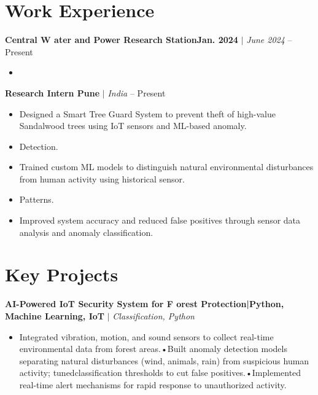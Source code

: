 \documentclass[10pt,letterpaper]{article}
\begin{document}
\section{Work Experience}

\noindent \textbf{Central W ater and Power Research StationJan. 2024} $|$ \textit{June 2024} \hfill  -- Present \\

\begin{itemize}
    
    \item 
    
\end{itemize}
\vspace{4pt}

\noindent \textbf{Research Intern Pune} $|$ \textit{India} \hfill  -- Present \\

\begin{itemize}
    
    \item Designed a Smart Tree Guard System to prevent theft of high-value Sandalwood trees using IoT sensors and ML-based anomaly.
    
    \item Detection.
    
    \item Trained custom ML models to distinguish natural environmental disturbances from human activity using historical sensor.
    
    \item Patterns.
    
    \item Improved system accuracy and reduced false positives through sensor data analysis and anomaly classification.
    
\end{itemize}
\vspace{4pt}




\section{Key Projects}

\noindent \textbf{AI-Powered IoT Security System for F orest Protection|Python, Machine Learning, IoT} $|$ \textit{Classification, Python} 

\begin{itemize}
    
    \item Integrated vibration, motion, and sound sensors to collect real-time environmental data from forest areas.•Built anomaly detection models separating natural disturbances (wind, animals, rain) from suspicious human activity; tunedclassification thresholds to cut false positives.•Implemented real-time alert mechanisms for rapid response to unauthorized activity.
    
\end{itemize}
\vspace{3pt}
\end{document}
